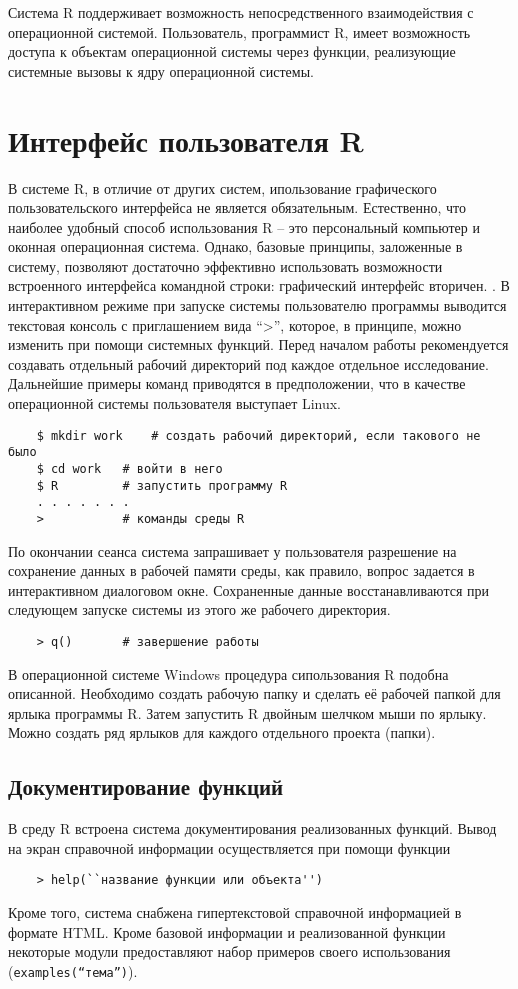 \documentclass[12pt, openany, twoside]{book} %
\begin{document}
Система R поддерживает возможность непосредственного взаимодействия с операционной системой. Пользователь, программист R, имеет возможность доступа к объектам операционной системы через функции, реализующие системные вызовы к ядру операционной системы.

\section{Интерфейс пользователя R}
В системе R, в отличие от других систем, ипользование графического пользовательского интерфейса не является обязательным. Естественно, что наиболее удобный способ использования R – это персональный компьютер и оконная операционная система. Однако, базовые принципы, заложенные в систему, позволяют достаточно эффективно использовать возможности встроенного интерфейса командной строки: графический интерфейс вторичен.
.
В интерактивном режиме при запуске системы пользователю программы  выводится текстовая консоль с приглашением вида ``>'', которое, в принципе, можно изменить при помощи системных функций. Перед началом работы рекомендуется создавать отдельный рабочий директорий под каждое отдельное исследование. Дальнейшие примеры команд приводятся в предположении, что в качестве операционной системы пользователя выступает Linux.
{\tt\begin{verbatim}
	$ mkdir work 	# создать рабочий директорий, если такового не было
	$ cd work	# войти в него
	$ R			# запустить программу R
	. . . . . . .
	> 	 		# команды среды R
\end{verbatim}}
По окончании сеанса система запрашивает у пользователя разрешение на сохранение данных в рабочей памяти среды, как правило, вопрос задается в интерактивном диалоговом окне. Сохраненные данные восстанавливаются при следующем запуске системы из этого же рабочего директория.
{\tt\begin{verbatim}
	> q() 		# завершение работы
\end{verbatim}}

В операционной системе Windows процедура сипользования R подобна описанной. Необходимо создать рабочую папку и сделать её рабочей папкой для ярлыка программы R. Затем  запустить R двойным шелчком мыши по ярлыку. Можно создать ряд ярлыков для каждого отдельного проекта (папки).

\subsection{Документирование функций}
В среду R встроена система документирования реализованных функций. Вывод на экран справочной информации осуществляется при помощи функции
{\tt\begin{verbatim}
	> help(``название функции или объекта'')
\end{verbatim}}
Кроме того, система снабжена гипертекстовой справочной информацией в формате HTML.
Кроме базовой информации и реализованной функции некоторые модули предоставляют набор примеров своего использования (\texttt{examples(``тема'')}).
\end{document}
